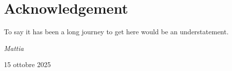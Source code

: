 \chapter*{Acknowledgement}

To say it has been a long journey to get here would be an understatement. 

\begin{flushright}
    \emph{Mattia}\par
    15 ottobre 2025
\end{flushright}